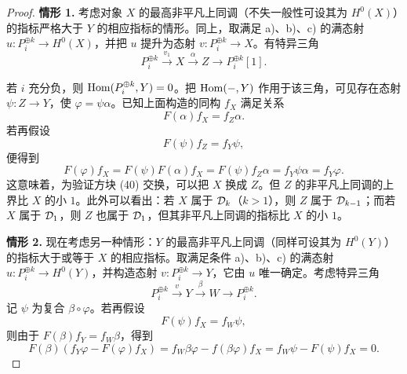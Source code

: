 \begin{proof}
\textbf{情形 1.} 考虑对象 $X$ 的最高非平凡上同调（不失一般性可设其为 $H^{0}(X)$）的指标严格大于 $Y$ 的相应指标的情形。同上，取满足 a)、b)、c) 的满态射 $u:P_i^{\oplus k}\longrightarrow H^{0}(X)$，并把 $u$ 提升为态射 $v:P_i^{\oplus k}\longrightarrow X$。有特异三角
\begin{equation*}
P_i^{\oplus k}\xrightarrow{\ v_1\ }X\xrightarrow{\ \alpha\ }Z\longrightarrow P_i^{\oplus k}[1].
\end{equation*}

若 $i$ 充分负，则 $\operatorname{Hom}(P_i^{\oplus k},Y)=0$。把 $\operatorname{Hom}(-,Y)$ 作用于该三角，可见存在态射 $\psi:Z\longrightarrow Y$，使 $\varphi=\psi\alpha$。已知上面构造的同构 $f_X$ 满足关系
\begin{equation*}
F(\alpha)f_X=f_Z\alpha.
\end{equation*}
若再假设
\begin{equation*}
F(\psi)f_Z=f_Y\psi,
\end{equation*}
便得到
\begin{equation*}
F(\varphi)f_X=F(\psi)F(\alpha)f_X=F(\psi)f_Z\alpha=f_Y\psi\alpha=f_Y\varphi.
\end{equation*}
这意味着，为验证方块 (40) 交换，可以把 $X$ 换成 $Z$。但 $Z$ 的非平凡上同调的上界比 $X$ 的小 $1$。此外可以看出：若 $X$ 属于 $\mathcal{D}_k$（$k>1$），则 $Z$ 属于 $\mathcal{D}_{k-1}$；而若 $X$ 属于 $\mathcal{D}_1$，则 $Z$ 也属于 $\mathcal{D}_1$，但其非平凡上同调的指标比 $X$ 的小 $1$。

\textbf{情形 2.} 现在考虑另一种情形：$Y$ 的最高非平凡上同调（同样可设其为 $H^{0}(Y)$）的指标大于或等于 $X$ 的相应指标。取满足条件 a)、b)、c) 的满态射 $u:P_i^{\oplus k}\longrightarrow H^{0}(Y)$，并构造态射 $v:P_i^{\oplus k}\longrightarrow Y$，它由 $u$ 唯一确定。考虑特异三角
\begin{equation}
P_i^{\oplus k}\xrightarrow{\ v\ }Y\xrightarrow{\ \beta\ }W\longrightarrow P_i^{\oplus k}.\tag{41}
\end{equation}
记 $\psi$ 为复合 $\beta\circ\varphi$。若再假设
\begin{equation*}
F(\psi)f_X=f_W\psi,
\end{equation*}
则由于 $F(\beta)f_Y=f_W\beta$，得到
\begin{equation}
F(\beta)(f_Y\varphi-F(\varphi)f_X)=f_W\beta\varphi-f(\beta\varphi)f_X=f_W\psi-F(\psi)f_X=0.\tag{42}
\end{equation}



\end{proof}
